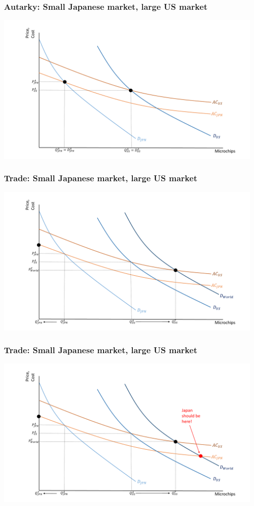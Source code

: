 \documentclass{beamer}
\begin{document}
\begin{frame}
	\frametitle{Autarky: Small Japanese market, large US market}
	\includegraphics[scale=0.32]{SL4_20.pdf}
\end{frame}

\begin{frame}
	\frametitle{Trade: Small Japanese market, large US market}
	\includegraphics[scale=0.32]{SL4_21.pdf}
\end{frame}

\begin{frame}
	\frametitle{Trade: Small Japanese market, large US market}
	\includegraphics[scale=0.32]{SL4_22.pdf}
\end{frame}
\end{document}
